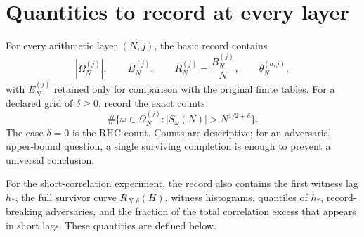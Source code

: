 \documentclass[11pt]{article}
\newcommand{\Om}{\Omega}
\begin{document}
\section{Quantities to record at every layer}
For every arithmetic layer $(N,j)$, the basic record contains
\[
 |\Om_N^{(j)}|,
 \qquad
 B_N^{(j)},
 \qquad
 R_N^{(j)}=\frac{B_N^{(j)}}N,
 \qquad
 \theta_N^{(a,j)},
\]
with $E_N^{(j)}$ retained only for comparison with the original finite tables. For a declared grid of $\delta\ge0$, record the exact counts
\[
 \#\{\omega\in\Om_N^{(j)}:|S_\omega(N)|>N^{1/2+\delta}\}.
\]
The case $\delta=0$ is the RHC count. Counts are descriptive; for an adversarial upper-bound question, a single surviving completion is enough to prevent a universal conclusion.

For the short-correlation experiment, the record also contains the first witness lag $h_*$, the full survivor curve $R_{N,\delta}(H)$, witness histograms, quantiles of $h_*$, record-breaking adversaries, and the fraction of the total correlation excess that appears in short lags. These quantities are defined below.
\end{document}
